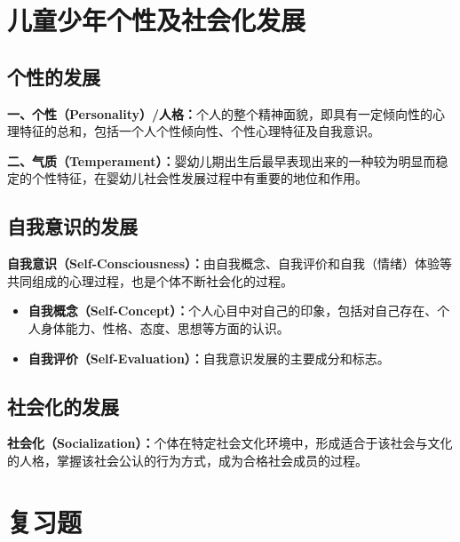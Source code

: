 \section{儿童少年个性及社会化发展}

\subsection{个性的发展}

\begin{defbox}
\textbf{一、个性（Personality）/人格：}个人的整个精神面貌，即具有一定倾向性的心理特征的总和，包括一个人个性倾向性、个性心理特征及自我意识。

\textbf{二、气质（Temperament）：}婴幼儿期出生后最早表现出来的一种较为明显而稳定的个性特征，在婴幼儿社会性发展过程中有重要的地位和作用。
\end{defbox}

\subsection{自我意识的发展}

\begin{defbox}
\textbf{自我意识（Self-Consciousness）：}由自我概念、自我评价和自我（情绪）体验等共同组成的心理过程，也是个体不断社会化的过程。

\begin{itemize}[leftmargin=*]
    \item \textbf{自我概念（Self-Concept）：}个人心目中对自己的印象，包括对自己存在、个人身体能力、性格、态度、思想等方面的认识。
    \item \textbf{自我评价（Self-Evaluation）：}自我意识发展的主要成分和标志。
\end{itemize}
\end{defbox}

\subsection{社会化的发展}

\begin{defbox}
\textbf{社会化（Socialization）：}个体在特定社会文化环境中，形成适合于该社会与文化的人格，掌握该社会公认的行为方式，成为合格社会成员的过程。
\end{defbox}

\section{复习题}

